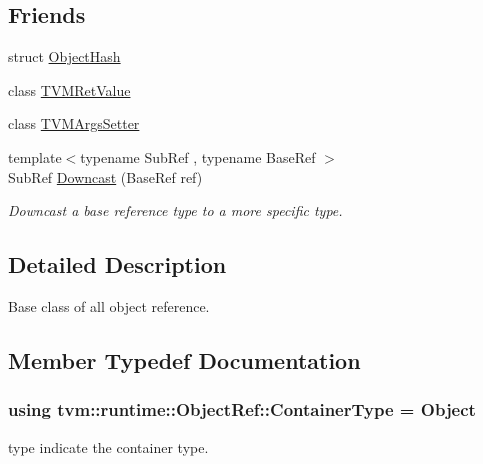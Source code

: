 \subsection*{Friends}
\begin{DoxyCompactItemize}
\item 
struct \hyperlink{classtvm_1_1runtime_1_1ObjectRef_a7191cb82e9344bec1b5fd20f45b289f1}{Object\+Hash}
\item 
class \hyperlink{classtvm_1_1runtime_1_1ObjectRef_ae0ea8b4adc6dab8c74086bceaef6b3e1}{T\+V\+M\+Ret\+Value}
\item 
class \hyperlink{classtvm_1_1runtime_1_1ObjectRef_a35ae555d4becf356b16aeacd353d41ee}{T\+V\+M\+Args\+Setter}
\item 
{\footnotesize template$<$typename Sub\+Ref , typename Base\+Ref $>$ }\\Sub\+Ref \hyperlink{classtvm_1_1runtime_1_1ObjectRef_a68c32a41efd1aa99afca70837565cced}{Downcast} (Base\+Ref ref)
\begin{DoxyCompactList}\small\item\em Downcast a base reference type to a more specific type. \end{DoxyCompactList}\end{DoxyCompactItemize}


\subsection{Detailed Description}
Base class of all object reference. 

\subsection{Member Typedef Documentation}
\subsubsection[{\texorpdfstring{Container\+Type}{ContainerType}}]{\setlength{\rightskip}{0pt plus 5cm}using {\bf tvm\+::runtime\+::\+Object\+Ref\+::\+Container\+Type} =  {\bf Object}}\hypertarget{classtvm_1_1runtime_1_1ObjectRef_aa5c355fbb7d2f7402ee360dba8a52cdd}{}\label{classtvm_1_1runtime_1_1ObjectRef_aa5c355fbb7d2f7402ee360dba8a52cdd}


type indicate the container type. 



